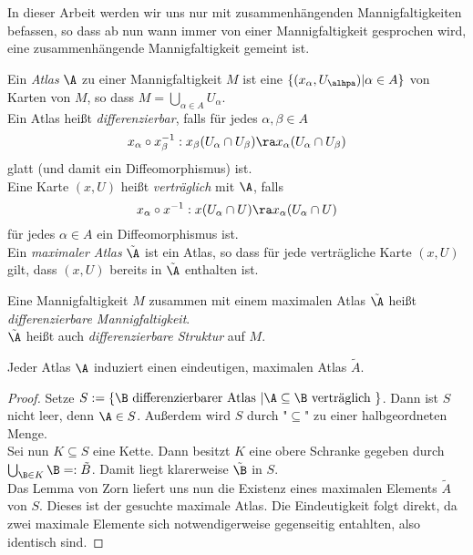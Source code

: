 \begin{rem}
  In dieser Arbeit werden wir uns nur mit zusammenhängenden Mannigfaltigkeiten befassen, so dass ab nun wann immer von einer Mannigfaltigkeit gesprochen wird, eine zusammenhängende Mannigfaltigkeit gemeint ist.
\end{rem}

\begin{defin}[Atlas]
  Ein \emph{Atlas} $\A$ zu einer Mannigfaltigkeit $M$ ist eine $\{ (x_\alpha, U_\alhpa) | \alpha \in A\}$ von Karten von $M$, so dass $M = \bigcup_{\alpha \in A} U_\alpha$.\\
  Ein Atlas heißt \emph{differenzierbar}, falls für jedes $\alpha, \beta \in A$
  \[
  x_\alpha \circ x_\beta^{-1} : x_\beta(U_\alpha \cap U_\beta) \ra x_\alpha(U_\alpha \cap U_\beta)
  \]
  glatt (und damit ein Diffeomorphismus) ist. \\
  Eine Karte $(x,U)$ heißt \emph{verträglich} mit $\A$, falls
  \[
  x_\alpha \circ x^{-1} : x(U_\alpha \cap U) \ra x_\alpha (U_\alpha \cap U)
  \]
  für jedes $\alpha \in A$ ein Diffeomorphismus ist. \\
  Ein \emph{maximaler Atlas} $\tilde \A$ ist ein Atlas, so dass für jede verträgliche Karte $(x,U)$ gilt, dass $(x,U)$ bereits in $\tilde \A$ enthalten ist.
\end{defin}

\begin{defin}
  Eine Mannigfaltigkeit $M$ zusammen mit einem maximalen Atlas $\tilde \A$ heißt \emph{differenzierbare Mannigfaltigkeit}. \\
  $\tilde \A$ heißt auch \emph{differenzierbare Struktur} auf $M$.
\end{defin}

\begin{prop}
  Jeder Atlas $\A$ induziert einen eindeutigen, maximalen Atlas $\tilde A$.
\end{prop}

\begin{proof}
  Setze $S := \{ \B \text{ differenzierbarer Atlas } | \A \subseteq \B \text{ verträglich }\}$. Dann ist $S$ nicht leer, denn $\A \in S$. Außerdem wird $S$ durch "$\subseteq$" zu einer halbgeordneten Menge. \\
  Sei nun $K\subseteq S$ eine Kette. Dann besitzt $K$ eine obere Schranke gegeben durch $\bigcup_{\B \in K} \B=: \tilde B$. Damit liegt klarerweise $\tilde \B$ in $S$. \\
  Das Lemma von Zorn liefert uns nun die Existenz eines maximalen Elements $\tilde A$ von $S$. Dieses ist der gesuchte maximale Atlas. Die Eindeutigkeit folgt direkt, da zwei maximale Elemente sich notwendigerweise gegenseitig entahlten, also identisch sind.
\end{proof}

